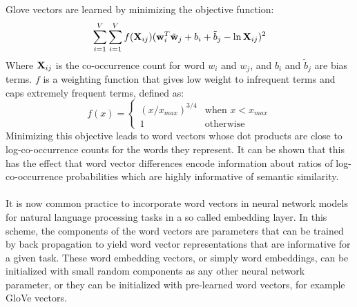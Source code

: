  Glove vectors are learned by minimizing the objective function:
$$
\sum\limits_{i=1}^V\sum\limits_{i=1}^V f(\mathbf{X}_{ij})(\mathbf{w}_i^T\tilde{\mathbf{w}}_j + b_i + \tilde{b}_j - \ln \mathbf{X}_{ij})^2
$$
Where $\mathbf{X}_{ij}$ is the co-occurrence count for word $w_i$ and $w_j$, and $b_i$ and $\tilde{b}_j$ are bias terms. $f$ is a weighting function that gives low weight to infrequent terms and caps extremely frequent terms, defined as:
$$
f(x) = \begin{cases}
	(x / x_{max})^{3/4} & \text{when $x < x_{max}$} \\
	1 & \text{otherwise}
\end{cases}
$$
Minimizing this objective leads to word vectors whose dot products are close to log-co-occurrence counts for the words they represent. It can be shown that this has the effect that word vector differences encode information about ratios of log-co-occurrence probabilities which are highly informative of semantic similarity.
\\\\
It is now common practice to incorporate word vectors in neural network models for natural language processing tasks in a so called embedding layer. In this scheme, the components of the word vectors are parameters that can be trained by back propagation to yield word vector representations that are informative for a given task. These word embedding vectors, or simply word embeddings, can be initialized with small random components as any other neural network parameter, or they can be initialized with pre-learned word vectors, for example GloVe vectors.